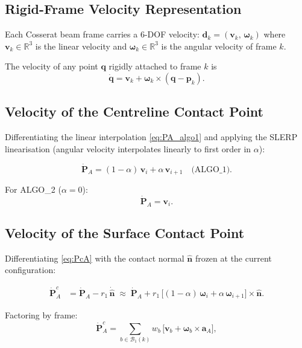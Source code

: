 \documentclass[11pt, a4paper]{article}
\newcommand{\vv}[1]{\bm{#1}}
\newcommand{\nn}{\hat{\vv{n}}}
\begin{document}
\subsection{Rigid-Frame Velocity Representation}

Each Cosserat beam frame carries a $6$-DOF velocity:
$\vv{d}_k = (\vv{v}_k,\, \bm{\omega}_k)$
where $\vv{v}_k \in \mathbb{R}^3$ is the linear velocity and
$\bm{\omega}_k \in \mathbb{R}^3$ is the angular velocity of frame $k$.

The velocity of any point $\vv{q}$ rigidly attached to frame $k$ is
\begin{equation}
  \dot{\vv{q}} = \vv{v}_k + \bm{\omega}_k \times (\vv{q} - \vv{p}_k).
  \label{eq:rigid_vel}
\end{equation}

\subsection{Velocity of the Centreline Contact Point}

Differentiating the linear interpolation \eqref{eq:PA_algo1}
and applying the SLERP linearisation (angular velocity interpolates
linearly to first order in $\alpha$):

\begin{equation}
  \dot{\vv{P}}_A = (1-\alpha)\,\vv{v}_i + \alpha\,\vv{v}_{i+1}
  \quad \text{(ALGO\_1)}.
  \label{eq:Pdot_A}
\end{equation}

For ALGO\_2 ($\alpha = 0$):
\begin{equation}
  \dot{\vv{P}}_A = \vv{v}_i.
  \label{eq:Pdot_A2}
\end{equation}

\subsection{Velocity of the Surface Contact Point}

Differentiating \eqref{eq:PcA} with the contact normal $\nn$ frozen
at the current configuration:

\begin{align}
  \dot{\vv{P}}^c_A
  &= \dot{\vv{P}}_A - r_1\,\dot{\nn}
  \;\approx\; \dot{\vv{P}}_A + r_1\,\bigl[(1-\alpha)\,\bm{\omega}_i
              + \alpha\,\bm{\omega}_{i+1}\bigr] \times \nn.
  \label{eq:PcAdot_intermediate}
\end{align}

Factoring by frame:
\begin{equation}
  \boxed{
  \dot{\vv{P}}^c_A
  = \sum_{b \in \mathcal{B}_1(k)}
    w_b\,\bigl[\vv{v}_b + \bm{\omega}_b \times \vv{a}_A\bigr],
  }
  \label{eq:PcAdot}
\end{equation}
\end{document}
